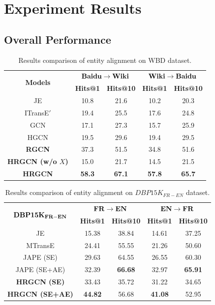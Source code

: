 


	\section{Experiment Results}
	
	
	\subsection{Overall Performance}
		\begin{table}
		\centering
		\scriptsize
		\begin{tabular}{c|cc|cc}
			\toprule
			\multirow{2}{*}{\bf Models} &  \multicolumn{2}{c|}{$\bf Baidu \rightarrow Wiki$} & \multicolumn{2}{c}{$\bf Wiki \rightarrow Baidu$} \\
			& \bf Hits@1 & \bf Hits@10 & \bf Hits@1 & \bf Hits@10 \\
			\midrule
			JE & 10.8 & 21.6 & 10.2 & 20.3 \\
			ITransE$'$ & 19.4 & 25.5 & 17.6 & 24.8 \\
			GCN & 17.1 & 27.3 & 15.7 & 25.9 \\
			HGCN & 19.5 & 29.6 & 19.4 & 29.5  \\
			\bf RGCN & 37.3 & 51.5 & 34.8 & 51.6 \\
			\bf HRGCN (w/o $X$) & 15.0 & 21.7 & 14.5 & 21.5 \\
			\bf HRGCN & \bf 58.3 & \bf 67.1 & \bf 57.8 & \bf 65.7 \\
			\bottomrule
		\end{tabular}
		\caption{Results comparison of entity alignment on WBD dataset.}
		\label{f1}
	\end{table}
	\begin{table}
		\centering
		\scriptsize
		\begin{tabular}{c|cc|cc}
			\toprule
			\multirow{2}{*}{$\bf DBP15K_{FR-EN}$} & \multicolumn{2}{c|}{$\bf FR \rightarrow EN$} & \multicolumn{2}{c}{$\bf EN \rightarrow FR$} \\
			& \bf Hits@1 & \bf Hits@10 & \bf Hits@1 & \bf Hits@10 \\
			\midrule
			JE & 15.38 & 38.84 & 14.61 & 37.25 \\
			\midrule
			MTransE & 24.41 & 55.55 & 21.26 & 50.60 \\
			\midrule
			JAPE (SE) & 29.63 & 64.55 & 26.55 & 60.30 \\
			JAPE (SE+AE) & 32.39 & \bf 66.68 & 32.97 & \bf 65.91 \\
			\midrule
			\bf HRGCN (SE) & 33.43& 35.72& 31.22& 34.65\\
			\bf HRGCN (SE+AE) & \bf 44.82 & 56.68 &\bf 41.08 & 52.95\\
			\bottomrule
		\end{tabular}
		\caption{Results comparison of entity alignment on $DBP15K_{FR-EN}$ dataset.}
		\label{cross}
	\end{table}
